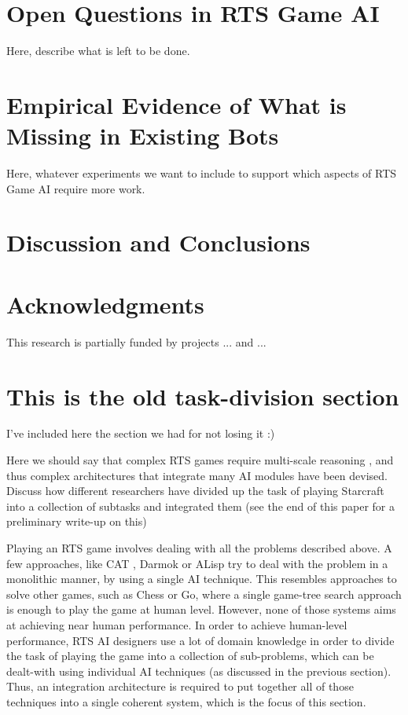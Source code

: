 \documentclass[journal]{IEEEtran}
\begin{document}
\section{Open Questions in RTS Game AI}\label{sec:questions}

{\color{blue}
Here, describe what is left to be done.
}


\section{Empirical Evidence of What is Missing in Existing Bots}\label{sec:experiments}

{\color{blue}
Here, whatever experiments we want to include to support which aspects of RTS Game AI require more work.
}

\section{Discussion and Conclusions}\label{sec:conclusions}



\section*{Acknowledgments} {\color{blue} This research is partially funded by projects ... and ... }


\appendix

\section*{This is the old task-division section}

{\color{red}
I've included here the section we had for not losing it :)
}

{\color{blue}
Here we should say that complex RTS games require multi-scale reasoning \cite{WeberCig10}, and thus complex architectures that integrate many AI modules have been devised. Discuss how different researchers have divided up the task of playing Starcraft into a collection of subtasks and integrated them (see the end of this paper for a preliminary write-up on this)
}


Playing an RTS game involves dealing with all the problems described above. A few approaches, like CAT \cite{LTW}, Darmok \cite{OntanonMSR10} or ALisp \cite{Marthi05} try to deal with the problem in a monolithic manner, by using a single AI technique. This resembles approaches to solve other games, such as Chess or Go, where a single game-tree search approach is enough to play the game at human level. However, none of those systems aims at achieving near human performance. In order to achieve human-level performance, RTS AI designers use a lot of domain knowledge in order to divide the task of playing the game into a collection of sub-problems, which can be dealt-with using individual AI techniques (as discussed in the previous section). Thus, an integration architecture is required to put together all of those techniques into a single coherent system, which is the focus of this section.
\end{document}
